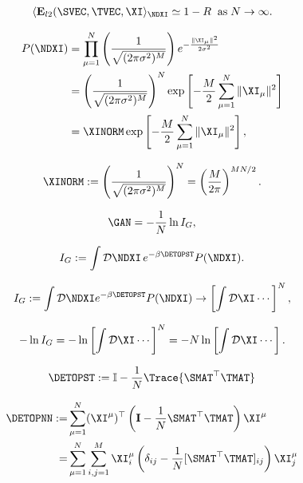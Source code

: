 \begin{align}
\label{eqn:Gan4}
\langle  \mathbf{E}_{l2}(\SVEC,\TVEC,\XI \rangle_{\NDXI} \simeq 1-R\;\;\text{as}\;N\rightarrow\infty  .
\end{align}

\begin{align}
  \label{eqn:pndx_vec}
  P(\NDXI) &= \prod_{\mu=1}^{N} \left( \frac{1}{\sqrt{(2 \pi \sigma^2)^M}} \right) e^{-\frac{\|\XI_{\mu}\|^2}{2 \sigma^2}} \\ \nonumber
  &= \left( \frac{1}{\sqrt{(2 \pi \sigma^2)^M}} \right)^{N} \exp\left[-\frac{M}{2}\sum_{\mu=1}^{N}\|\XI_{\mu}\|^2\right] \\ \nonumber
  &= \XINORM \exp\left[-\frac{M}{2}\sum_{\mu=1}^{N}\|\XI_{\mu}\|^2\right] ,
\end{align}

\begin{align}
\label{eqn:xinorm}
\XINORM 
:=\left( \frac{1}{\sqrt{(2 \pi \sigma^2)^M}} \right)^{N}
 =\left( \frac{M}{2\pi} \right)^{MN/2} .
\end{align}

\begin{align}
  \label{eqn:Gan_lnI}
  \GAN=-\frac{1}{N}\ln I_G ,
\end{align}

\begin{align}
\label{eqn:InsideGan}
I_G := \int\mathcal{D}\NDXI \, e^{-\beta \DETOPST} P(\NDXI) .
\end{align}

\begin{align}
I_G := \int\mathcal{D}\NDXI  e^{-\beta \DETOPST} P(\NDXI)  \rightarrow\left[\int\mathcal{D}\XI \cdots \right]^{N} ,
\end{align}

\begin{align}
-\ln I_{G} = -\ln\left[\int\mathcal{D}\XI \cdots \right]^{N}= -N\ln\left[\int\mathcal{D}\XI \cdots \right] .
\end{align}

\begin{align}
 \label{eqn:DETOPST}
\DETOPST  := \mathbb{I} - \frac{1}{N}\Trace{\SMAT^{\top}\TMAT}
\end{align}

\begin{align}
 \label{eqn:DETOPNN}
 \DETOPNN
 :=& \sum_{\mu=1}^{N} (\XI^{\mu})^{\top} \left( \mathbf{I} - \frac{1}{N} \SMAT^{\top}\TMAT \right) \XI^{\mu} \\ \nonumber
  =&  \sum_{\mu=1}^{N} \sum_{i,j=1}^{M} \XI_i^{\mu} \left( \delta_{ij} - \frac{1}{N} [\SMAT^{\top}\TMAT]_{ij} \right) \XI_j^{\mu} 
\end{align}

